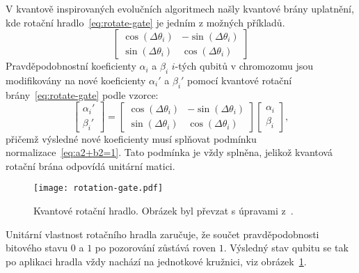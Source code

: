 V kvantově inspirovaných evolučních algoritmech našly kvantové brány uplatnění, kde rotační hradlo~\ref{eq:rotate-gate} je jedním z možných příkladů.
\begin{equation}\label{eq:rotate-gate}
    \begin{bmatrix}
        \cos{\left( \Delta\theta_i \right)} & - \sin{\left( \Delta\theta_i \right)} \\
        \sin{\left( \Delta\theta_i \right)} &   \cos{\left( \Delta\theta_i \right)}
    \end{bmatrix}
\end{equation}
Pravděpodobnostní koeficienty $\alpha_i$ a $\beta_i$ $i$-tých qubitů v chromozomu jsou modifikovány na nové koeficienty $\alpha_i'$ a $\beta_i'$ pomocí kvantové rotační brány~\ref{eq:rotate-gate} podle vzorce: 
\begin{equation}\label{eq:rotation-gate-angles}
    \begin{bmatrix}
        \alpha_i' \\
        \beta_i' 
    \end{bmatrix}
    =
    \begin{bmatrix}
        \cos{\left( \Delta\theta_i \right)} & - \sin{\left( \Delta\theta_i \right)} \\
        \sin{\left( \Delta\theta_i \right)} &   \cos{\left( \Delta\theta_i \right)}
    \end{bmatrix}
    \begin{bmatrix}
        \alpha_i \\
        \beta_i 
    \end{bmatrix},
\end{equation}
přičemž výsledné nové koeficienty musí splňovat podmínku normalizace~\ref{eq:a2+b2=1}. 
Tato podmínka je vždy splněna, jelikož kvantová rotační brána odpovídá unitární matici. 
\begin{figure}[ht!]
    \centering
    \texttt{[image: rotation-gate.pdf]}
    \caption{Kvantové rotační hradlo. Obrázek byl převzat s úpravami z~\cite{NaturalComputing}.}
    \label{fig:rotation-gate}
\end{figure}
Unitární vlastnost rotačního hradla zaručuje, že součet pravděpodobnosti bitového stavu $0$ a $1$ po pozorování zůstává roven $1$. 
Výsledný stav qubitu se tak po aplikaci hradla vždy nachází na jednotkové kružnici, viz obrázek~\ref{fig:rotation-gate}.

